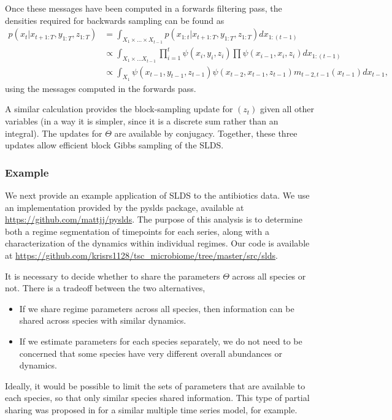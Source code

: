 \documentclass[14pt]{extarticle}
\begin{document}
Once these messages have been computed in a forwards filtering pass, the
densities required for backwards sampling can be found as
\begin{align*}
  p\left(x_t \vert x_{t + 1:T}, y_{1:T}, z_{1:T}\right) &=
  \int_{X_1 \times \dots \times X_{t - 1}} p\left(x_{1:t} \vert x_{t + 1: T}, y_{1:T}, z_{1:T}\right) dx_{1:(t - 1)} \\
  &\propto \int_{X_1 \times \dots X_{t - 1}} \prod_{i = 1}^{t} \psi\left(x_i, y_i, z_i\right) \prod \psi\left(x_{i - 1}, x_i, z_i\right) dx_{1:\left(t - 1\right)} \\
  &\propto \int_{X_{1}} \psi\left(x_{t - 1}, y_{t - 1}, z_{t - 1}\right)\psi\left(x_{t - 2}, x_{t - 1}, z_{t - 1}\right) m_{t - 2, t - 1}\left(x_{t - 1}\right) d x_{t - 1},
\end{align*}
using the messages computed in the forwards pass.

A similar calculation provides the block-sampling update for
$\left(z_{t}\right)$ given all other variables (in a way it is simpler, since it
is a discrete sum rather than an integral). The updates for $\Theta$ are
available by conjugacy. Together, these three updates allow efficient block
Gibbs sampling of the SLDS.

\subsubsection{Example}
\label{subsubsec:slds_example}

We next provide an example application of SLDS to the antibiotics data. We use
an implementation provided by the pyslds package, available at
\url{https://github.com/mattjj/pyslds}. The purpose of this analysis is to
determine both a regime segmentation of timepoints for each series, along with a
characterization of the dynamics within individual regimes. Our code is
available at
\url{https://github.com/krisrs1128/tsc_microbiome/tree/master/src/slds}.

It is necessary to decide whether to share the parameters $\Theta$ across all
species or not. There is a tradeoff between the two alternatives,
\begin{itemize}
\item If we share regime parameters across all species, then information can be
  shared across species with similar dynamics.
\item If we estimate parameters for each species separately, we do not need to
  be concerned that some species have very different overall abundances or
  dynamics.
\end{itemize}
Ideally, it would be possible to limit the sets of parameters that are available
to each species, so that only similar species shared information. This type of
partial sharing was proposed in \citep{fox2009sharing} for a similar multiple
time series model, for example.
\end{document}

